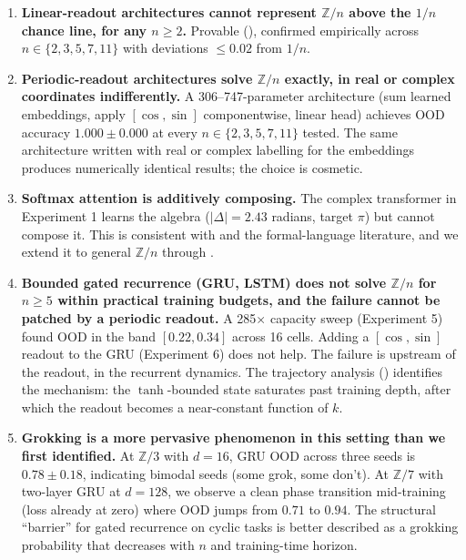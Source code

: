 \documentclass[11pt]{article}
\theoremstyle{definition}
\newcommand{\Z}{\mathbb{Z}}
\begin{document}
\begin{enumerate}[itemsep=2pt]
\item \textbf{Linear-readout architectures cannot represent $\Z/n$
above the $1/n$ chance line, for any $n \geq 2$.} Provable
(), confirmed empirically across
$n \in \{2, 3, 5, 7, 11\}$ with deviations $\leq 0.02$ from $1/n$.

\item \textbf{Periodic-readout architectures solve $\Z/n$ exactly,
in real or complex coordinates indifferently.} A 306--747-parameter
architecture (sum learned embeddings, apply $[\cos, \sin]$
componentwise, linear head) achieves OOD accuracy $1.000 \pm 0.000$
at every $n \in \{2, 3, 5, 7, 11\}$ tested. The same architecture
written with real or complex labelling for the embeddings produces
numerically identical results; the choice is cosmetic.

\item \textbf{Softmax attention is additively composing.} The
complex transformer in Experiment 1 learns the algebra
($|\Delta| = 2.43$ radians, target $\pi$) but cannot compose it.
This is consistent with \citet{hahn2020theoretical} and the
formal-language literature, and we extend it to general $\Z/n$
through .

\item \textbf{Bounded gated recurrence (GRU, LSTM) does not solve
$\Z/n$ for $n \geq 5$ within practical training budgets, and the
failure cannot be patched by a periodic readout.} A 285$\times$
capacity sweep (Experiment 5) found OOD in the band $[0.22, 0.34]$
across 16 cells. Adding a $[\cos, \sin]$ readout to the GRU
(Experiment 6) does not help. The failure is upstream of the
readout, in the recurrent dynamics. The trajectory analysis
() identifies the mechanism: the $\tanh$-bounded
state saturates past training depth, after which the readout
becomes a near-constant function of $k$.

\item \textbf{Grokking is a more pervasive phenomenon in this
setting than we first identified.} At $\Z/3$ with $d=16$, GRU OOD
across three seeds is $0.78 \pm 0.18$, indicating bimodal seeds
(some grok, some don't). At $\Z/7$ with two-layer GRU at $d=128$,
we observe a clean phase transition mid-training (loss already at
zero) where OOD jumps from $0.71$ to $0.94$. The structural
``barrier'' for gated recurrence on cyclic tasks is better
described as a grokking probability that decreases with $n$ and
training-time horizon.
\end{enumerate}
\end{document}
